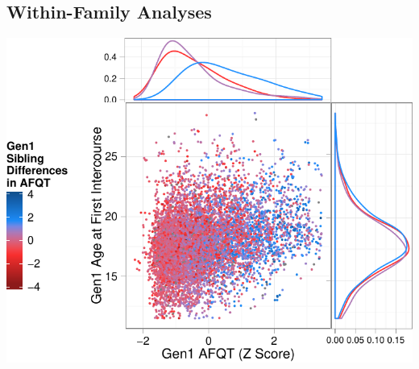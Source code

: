 \documentclass[a4paper,man,apacite,natbib,12pt,longtable,mask]{apa6}\usepackage[]{graphicx}\usepackage[]{color}
\newenvironment{knitrout}{}{} %
\begin{document}
\subsection{Within-Family Analyses}

%
\begin{landscape}
\noindent\begin{minipage}{\linewidth}
\label{plot_gen1_afi}
\begin{center}
\begin{knitrout}
\color{fgcolor}
\includegraphics[width=.8\paperwidth]{figure/plot_gen1_afi-1} 

\end{knitrout}
\end{center}\end{minipage}\end{landscape}

\end{document}
